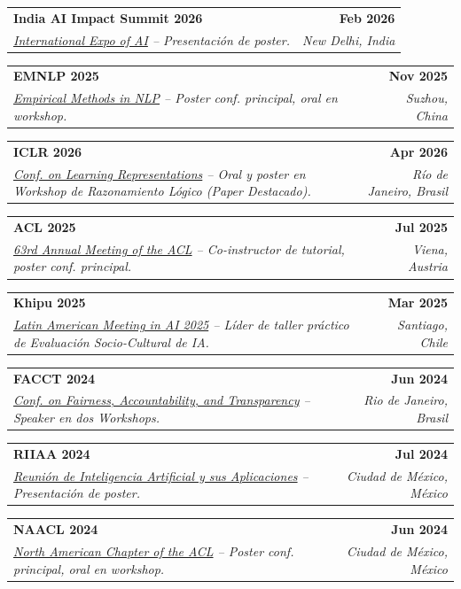 \documentclass[letterpaper,11pt]{article}
\makeatletter
\newif\ifeng
\newcommand{\lang}[2]{\ifeng #1\else #2\fi}
\newcommand{\resumeSubheading}[4]{
  \vspace{-2pt}\item
    \begin{tabular*}{1.0\textwidth}[t]{l@{\extracolsep{\fill}}r}
      \textbf{\large#1} & \textbf{\small #2} \\
      \textit{\large#3} & \textit{\small #4} \\
    \end{tabular*}\vspace{-7pt}
}
\makeatother
\begin{document}
        \resumeSubheading{India AI Impact Summit 2026 \href{https://impact.indiaai.gov.in/}{\raisebox{-0.1\height}\faExternalLink } }{Feb 2026}
        {\small \underline{International Expo of AI} \lang{-- Poster presentation.}{-- Presentación de poster.}}{New Delhi, India}

        \resumeSubheading{EMNLP 2025 \href{https://2025.emnlp.org/}{\raisebox{-0.1\height}\faExternalLink } }{Nov 2025}
        {\small \underline{Empirical Methods in NLP} \lang{-- Poster at main conf., oral at workshop.}{-- Poster conf. principal, oral en workshop.}}{Suzhou, China}

        \resumeSubheading{ICLR 2026 \href{https://iclr.cc/}{\raisebox{-0.1\height}\faExternalLink } }{Apr 2026}
        {\small \underline{Conf. on Learning Representations} \lang{-- Oral and poster at Logical Reasoning Workshop (Featured Paper).}{-- Oral y poster en Workshop de Razonamiento Lógico (Paper Destacado).}}{\lang{Rio de Janeiro, Brazil}{Río de Janeiro, Brasil}}

        \resumeSubheading{ACL 2025 \href{https://2025.aclweb.org/}{\raisebox{-0.1\height}\faExternalLink } }{Jul 2025}
        {\small \underline{63rd Annual Meeting of the ACL} \lang{-- Tutorial co-instructor, poster at main conf.}{-- Co-instructor de tutorial, poster conf. principal.}}{\lang{Vienna, Austria}{Viena, Austria}}

        \resumeSubheading{Khipu 2025 \href{https://khipu.ai/}{\raisebox{-0.1\height}\faExternalLink } }{Mar 2025}
        {\small \underline{Latin American Meeting in AI 2025} \lang{-- Practical session leader on Socio-Cultural AI Evaluation.}{-- Líder de taller práctico de Evaluación Socio-Cultural de IA.}}{Santiago, Chile}
    
        \resumeSubheading{FACCT 2024 \href{https://facctconference.org/2024/}{\raisebox{-0.1\height}\faExternalLink } }{Jun 2024}
        {\small \underline{Conf. on Fairness, Accountability, and Transparency} \lang{-- Speaker at two Workshops.}{-- Speaker en dos Workshops.}}{\lang{Rio de Janeiro, Brazil}{Rio de Janeiro, Brasil}}

        \resumeSubheading{RIIAA 2024 \href{https://riiaa.org/}{\raisebox{-0.1\height}\faExternalLink } }{Jul 2024}
        {\small \underline{\lang{Artificial Intelligence and Applications Meeting}{Reunión de Inteligencia Artificial y sus Aplicaciones}} \lang{-- Poster presentation.}{-- Presentación de poster.}}{\lang{Mexico City, Mexico}{Ciudad de México, México}}

        \resumeSubheading{NAACL 2024 \href{https://2024.naacl.org/}{\raisebox{-0.1\height}\faExternalLink } }{Jun 2024}
        {\small \underline{North American Chapter of the ACL} \lang{-- Poster at main conf., oral at workshop, organized BoF.}{-- Poster conf. principal, oral en workshop.}}{\lang{Mexico City, Mexico}{Ciudad de México, México}}
\end{document}
